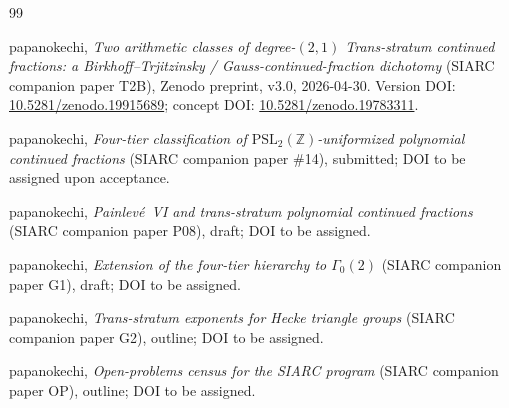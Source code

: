 \documentclass[11pt,a4paper]{article}
\theoremstyle{definition}
\theoremstyle{remark}
\newcommand{\PSLZ}{\mathrm{PSL}_2(\mathbb{Z})}
\begin{document}
\begin{thebibliography}{99}

papanokechi,
\emph{Two arithmetic classes of degree-$(2,1)$ Trans-stratum continued fractions: a Birkhoff--Trjitzinsky / Gauss-continued-fraction dichotomy}
(SIARC companion paper T2B),
Zenodo preprint, v3.0, 2026-04-30.
Version DOI: \href{https://doi.org/10.5281/zenodo.19915689}{10.5281/zenodo.19915689};
concept DOI: \href{https://doi.org/10.5281/zenodo.19783311}{10.5281/zenodo.19783311}.

papanokechi,
\emph{Four-tier classification of $\PSLZ$-uniformized polynomial continued fractions}
(SIARC companion paper \#14),
submitted; DOI to be assigned upon acceptance.

papanokechi,
\emph{Painlev\'e~VI and trans-stratum polynomial continued fractions}
(SIARC companion paper P08),
draft; DOI to be assigned.

papanokechi,
\emph{Extension of the four-tier hierarchy to $\Gamma_0(2)$}
(SIARC companion paper G1),
draft; DOI to be assigned.

papanokechi,
\emph{Trans-stratum exponents for Hecke triangle groups}
(SIARC companion paper G2),
outline; DOI to be assigned.

papanokechi,
\emph{Open-problems census for the SIARC program}
(SIARC companion paper OP),
outline; DOI to be assigned.

\end{thebibliography}
\end{document}
